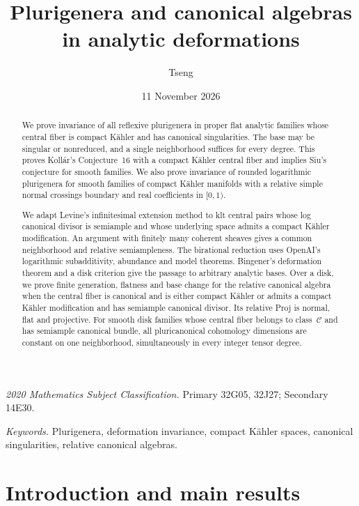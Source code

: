 \documentclass[11pt,a4paper]{article}
\title{Plurigenera and canonical algebras in analytic deformations}
\author{Tseng}
\date{11 November 2026}
\numberwithin{equation}{section}
\theoremstyle{definition}
\theoremstyle{remark}
\begin{document}
\maketitle
\begin{abstract}
We prove invariance of all reflexive plurigenera in proper flat
analytic families whose central fiber is compact Kähler and has
canonical singularities. The base may be singular or nonreduced,
and a single neighborhood suffices for every degree. This proves Kollár's Conjecture~16 with a compact
Kähler central fiber and implies Siu's conjecture for smooth families.
We also prove invariance of rounded logarithmic plurigenera for smooth
families of compact Kähler manifolds with a relative simple normal
crossings boundary and real coefficients in $[0,1)$.

We adapt Levine's infinitesimal extension method to klt central pairs
whose log canonical divisor is semiample and whose underlying space
admits a compact Kähler modification. An argument with finitely many
coherent sheaves gives a common neighborhood and relative semiampleness.
The birational reduction uses OpenAI's logarithmic subadditivity,
abundance and model theorems. Bingener's deformation theorem and a
disk criterion give the passage to arbitrary analytic bases.
Over a disk, we prove finite generation, flatness and base change for
the relative canonical algebra when the central fiber is canonical
and is either compact Kähler or admits a compact Kähler modification
and has semiample canonical divisor. Its relative Proj is normal,
flat and projective. For smooth disk families whose central fiber
belongs to class~$\mathcal C$ and has semiample canonical bundle,
all pluricanonical cohomology dimensions are constant on one
neighborhood, simultaneously in every integer tensor degree.
\end{abstract}
\begingroup
\small\noindent
\textit{2020 Mathematics Subject Classification.}
Primary 32G05, 32J27; Secondary 14E30.\par
\noindent\textit{Keywords.}
Plurigenera, deformation invariance, compact Kähler spaces,
canonical singularities, relative canonical algebras.
\endgroup
\setcounter{tocdepth}{1}
\begingroup
\small
\setlength{\parskip}{0pt}
\makeatletter
{}
\makeatother
\tableofcontents
\endgroup
\clearpage
\section{Introduction and main results}\label{sec:introduction}
\end{document}
